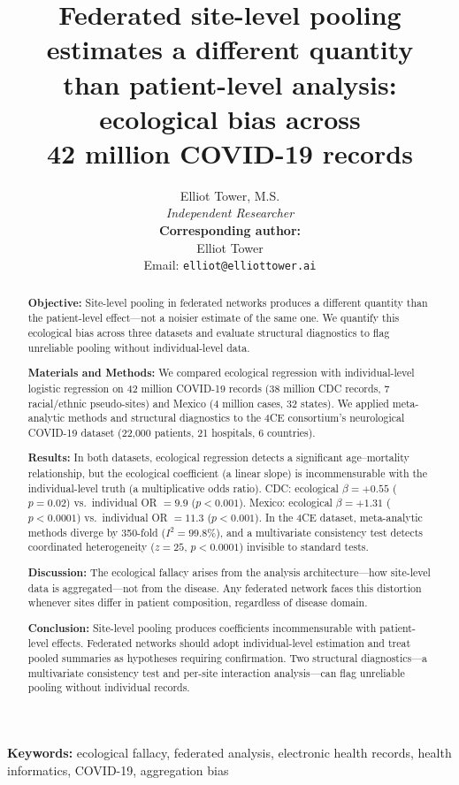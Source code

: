 \documentclass[11pt]{article}
\title{Federated site-level pooling estimates a different quantity\\than patient-level analysis: ecological bias across\\42 million COVID-19 records}
\author{Elliot Tower, M.S.\\
\textit{Independent Researcher}\\[6pt]
\textbf{Corresponding author:}\\
Elliot Tower\\
Email: \texttt{elliot@elliottower.ai}}
\date{}
\begin{document}
\maketitle

\begin{abstract}
\noindent\textbf{Objective:}
Site-level pooling in federated networks produces a different quantity
than the patient-level effect---not a noisier estimate of the same one.
We quantify this ecological bias across three datasets and evaluate
structural diagnostics to flag unreliable pooling without
individual-level data.

\noindent\textbf{Materials and Methods:}
We compared ecological regression with individual-level
logistic regression on 42 million COVID-19 records
(38 million CDC records, 7 racial/ethnic pseudo-sites) and Mexico
(4 million cases, 32 states).  We applied meta-analytic methods
and structural diagnostics to the 4CE consortium's neurological COVID-19
dataset (22,000 patients, 21 hospitals, 6 countries).

\noindent\textbf{Results:}
In both datasets, ecological regression detects a significant age--mortality
relationship, but the ecological coefficient (a linear slope)
is incommensurable with the individual-level truth (a multiplicative odds
ratio).  CDC: ecological $\beta = +0.55$ ($p = 0.02$) vs.\ individual
OR $= 9.9$ ($p < 0.001$).  Mexico: ecological $\beta = +1.31$
($p < 0.0001$) vs.\ individual OR $= 11.3$ ($p < 0.001$).  In the 4CE
dataset, meta-analytic methods diverge by 350-fold ($I^2 = 99.8\%$), and
a multivariate consistency test detects coordinated heterogeneity
($z = 25$, $p < 0.0001$) invisible to standard tests.

\noindent\textbf{Discussion:}
The ecological fallacy arises from the analysis architecture---how
site-level data is aggregated---not from the disease.
Any federated network faces this distortion whenever sites differ in
patient composition, regardless of disease domain.

\noindent\textbf{Conclusion:}
Site-level pooling produces coefficients incommensurable with
patient-level effects.  Federated networks should adopt individual-level
estimation and treat pooled summaries as hypotheses
requiring confirmation.  Two structural
diagnostics---a multivariate consistency test and per-site interaction
analysis---can flag unreliable pooling without individual records.
\end{abstract}

\noindent\textbf{Keywords:} ecological fallacy, federated analysis,
electronic health records, health informatics, COVID-19, aggregation bias
\end{document}
